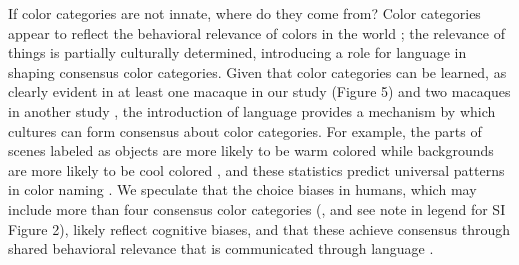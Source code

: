 If color categories are not innate, where do they come from? Color categories appear to reflect the behavioral relevance of colors in the world \citep{RN18616,gibson_color_2017}; the relevance of things is partially culturally determined, introducing a role for language in shaping consensus color categories. Given that color categories can be learned, as clearly evident in at least one macaque in our study (Figure 5) and two macaques in another study \citep{panichello_error-correcting_2019}, the introduction of language provides a mechanism by which cultures can form consensus about color categories. For example, the parts of scenes labeled as objects are more likely to be warm colored while backgrounds are more likely to be cool colored \citep{rosenthal_color_2018}, and these statistics predict universal patterns in color naming \citep{gibson_color_2017}. We speculate that the choice biases in humans, which may include more than four consensus color categories (\citep{skelton_biological_2017}, and see note in legend for SI Figure 2), likely reflect cognitive biases, and that these achieve consensus through shared behavioral relevance that is communicated through language \citep{RN18511,RN18514,RN18602}. 
